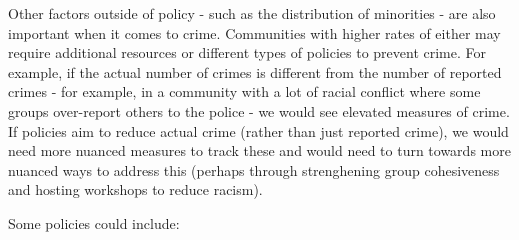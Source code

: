 \documentclass[]{article}
\begin{document}
Other factors outside of policy - such as the distribution of minorities
- are also important when it comes to crime. Communities with higher
rates of either may require additional resources or different types of
policies to prevent crime. For example, if the actual number of crimes
is different from the number of reported crimes - for example, in a
community with a lot of racial conflict where some groups over-report
others to the police - we would see elevated measures of crime. If
policies aim to reduce actual crime (rather than just reported crime),
we would need more nuanced measures to track these and would need to
turn towards more nuanced ways to address this (perhaps through
strenghening group cohesiveness and hosting workshops to reduce racism).

Some policies could include:
\end{document}

